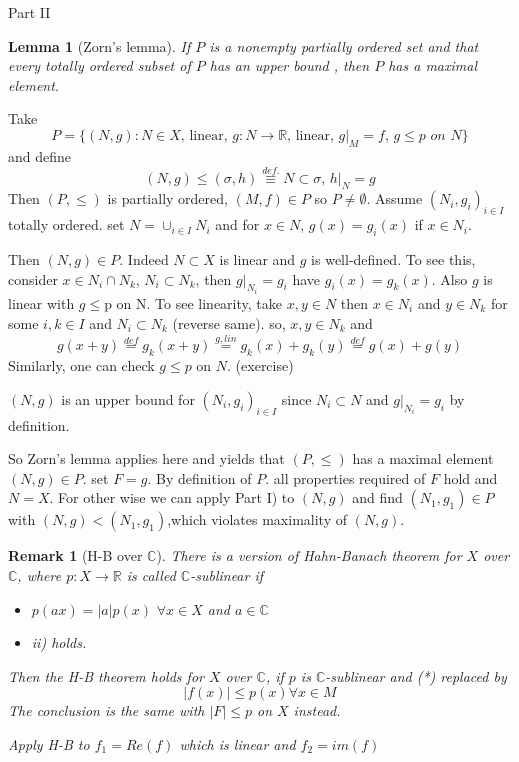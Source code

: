 \documentclass{article}
\newcommand{\nextline}{\hfill\break}
\newcommand{\func}[3]{${#1}:{#2}\xrightarrow{}{#3}$}
\newcommand{\real}{\mathbb{R}}
\newcommand{\comp}{\mathbb{C}}
\newtheorem{remark}[example]{Remark}
\newtheorem{lemma}[example]{Lemma}
\begin{document}
    \begin{pf}{Part II}{}
    \begin{lemma}[Zorn's lemma]%
        \rm\nextline
        If $P$ is a nonempty partially ordered set and that every totally ordered subset of $P$ has an upper bound , then $P$ has
        a maximal element.
    \end{lemma}

    Take 
    $$
P=\{(N,g):N\in X,\,\text{linear},\, g:N\rightarrow\real,\,\text{linear},\,g|_M=f,\,g\leq p\,\,on\,\, N\}
    $$
    and define
    $$
    (N,g)\leq(\sigma,h)\stackrel{def.}{\equiv}N\subset\sigma,\,h|_N=g
    $$
    Then $(P,\leq)$ is partially ordered, $(M,f)\in P$ so $P\not=\emptyset$. Assume $(N_i,g_i)_{i\in I}$ totally ordered. set $N=\cup_{i\in I}N_i$ and for $x\in N$, $g(x)=g_i(x)$ if $x\in N_i$.

    Then $(N,g)\in P$. Indeed $N\subset X$ is linear and $g$ is well-defined. To see this, consider $x\in N_i\cap N_k$, $N_i\subset N_k$, then  $g|_{N_i}=g_i$ have $g_i(x)=g_k(x)$. Also $g$ is linear with $g\leq $p on N. To see linearity, take $x,y\in N$ then $x\in N_i$ and $y \in N_k$ for some $i,k\in I$ and $N_i\subset N_k$ (reverse same). so, $x,y\in N_k$ and 
    $$
g(x+y)\stackrel{def}{=}g_k(x+y)\stackrel{g,lin}{=}g_k(x)+g_k(y)\stackrel{def}{=}g(x)+g(y)
    $$
    Similarly, one can check $g\leq p$ on $N$. (exercise)

    $(N,g)$ is an upper bound for $(N_i,g_i)_{i\in I}$ since $N_i\subset N$ and $g|_{N_i}=g_i$ by definition.

    So Zorn's lemma applies here and yields that $(P,\leq)$ has a maximal element $(N,g)\in P$. set $F=g$. By definition of $P$. all properties required of $F$ hold and $N=X$. For other wise we can apply Part I) to $(N,g)$ and find $(N_1,g_1)\in P$ with $(N,g)<(N_1,g_1)$,which violates maximality of $(N,g)$. 
    \end{pf}
\newpage
\begin{remark}[H-B over $\comp$]\rm\nextline
    There is a version of Hahn-Banach theorem for $X$ over $\comp$, where \func{p}{X}{\real} is called $\comp$-sublinear if \begin{itemize}
        \item $p(ax)=|a|p(x)\,\,\forall x\in X$ and $a\in \comp$
        \item ii) holds.
    \end{itemize}
    Then the H-B theorem holds for $X$ over $\comp$, if $p$ is $\comp$-sublinear and (*) replaced by
    $$
    |f(x)|\leq p(x)\forall x\in M
    $$
    The conclusion is the same with $|F|\leq p$ on $X$ instead.
    \begin{pf}{}{}
        Apply H-B to $f_1=Re(f)$ which is linear and $f_2=im(f)$
    \end{pf}
\end{remark}
\end{document}
